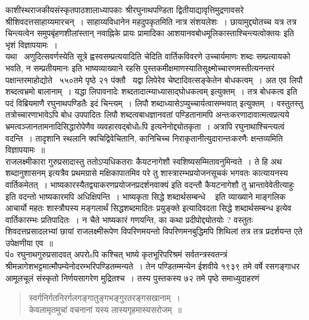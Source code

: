\documentclass[11pt, openany]{book}
\begin{document}
काशीस्थराजकीयसंस्कृतपाठशालाध्यापकाः श्रीरघुनाथपण्डिता द्वितीयाद्यावृत्तिमुद्रणावसरे श्रीशिवदत्तसाहाय्यमारचन्~। साहाय्यविधानेन महदुपकृतमिति नात्र संशयलेशः~। छायामुद्द्योतच्च यत्र तत्र चिन्त्यत्वेन समुपबृंहणशीलांस्तान् {\qt नवाह्निके प्रायः प्रामादिका आशयानवबोधमूलिकास्ताश्चिन्त्यत्वोक्तयः} इति भृशं विज्ञापयामः~।\\

यथा \textendash\ अणुदित्सवर्णस्येति सूत्रे ह्वस्वसम्प्रत्ययादिति चेदिति वार्तिकविवरणे {\qt उच्चार्यमाणः शब्दः सम्प्रत्यायको भवति, न सम्प्रतीयमानः} इति भाष्यव्याख्याने रहसि पुस्तकमीक्षमाणस्यातिसूक्ष्मोच्चारणमस्तीत्यनन्तरं पक्षान्तरमाहोद्योते \textendash\ ५५०तमे पृष्ठे २१ पंक्तौ \textendash\ {\qt यद्वा लिपेरेव चेष्टादिवत्सङ्केतेन बोधकत्वम्~। अत एव लिपौ शब्दत्वभ्रमो बालानाम्~। यद्धा लिपावनादेः शब्दतादात्म्याध्यासाद्घोधकत्वम्} इत्युक्तम्~। तत्र {\qt बोधकत्व इति पदं विब्रियमाणै रघुनाथपण्डितैः }इदं चिन्त्यम्~। लिपौ शब्दाध्यासेऽप्युच्चार्यत्वासम्भवात् इत्युक्तम्~। वस्तुतस्तु तत्रोच्चारणाभावेऽपि बोध उपपादितः {\qt लिपौ शब्दत्वबाधज्ञानवतां पण्डितानामपि अन्तःकरणादावात्मत्वप्रत्यये भ्रमत्वञ्जानतामनादिसिद्धारोपेणैव व्यवहारवद्बोधोsपि} इत्यनेनोद्द्योतकृता~। अत्रापि रघुनाथाश्चिन्त्यत्वं वदन्ति~। तादृशानि स्थलानि क्वचिद्विवेचितानि, कानिचिच्च निराकृतानीत्युदारान्तःकरणैः क्षन्तव्यमिति विज्ञापयामः~॥\\

राजलक्ष्मीकारा गुरुप्रसादास्तु ततोऽप्यधिकतराः कैयटनागेशौ स्वशिष्यसम्मितावनुमिन्वते~। ते हि अथ शब्दानुशासनम् इत्यत्रैव प्रथमग्रासे मक्षिकापातमिव {\qt परे तु शास्त्रारम्भप्रयोजनसूचकं भगवतः कात्यायनस्य वार्तिकमेतत्~। भाष्यकारस्यैतद्व्याकरणप्रयोजनप्रदर्शनवाक्यं इति वदन्तौ कैयटनागेशौ तु भ्रान्तावेवेतीत्याहुः} इति वदन्तो भाष्यकारमपि अधिक्षिपन्ति~। भाष्यकृता {\qt सिद्धे शब्दार्थसम्बन्धे \textendash\ } इति व्याख्याने {\qt माङ्गलिक आचार्यो महतः शास्त्रौघस्य मङ्गलार्थं सिद्धशब्दमादितः प्रयुङ्क्ते} इत्यादिवदता सिद्धे शब्दार्थसम्बन्ध इत्येव वार्तिकारम्भः प्रतिपादितः~। न चैते भाष्यकारं गणयन्ति, का कथा प्रदीपोद्द्योतयोः ? वस्तुतः शिवदत्तप्रसादलभ्यां छायां राजलक्ष्मीरूपेण विपरिणमयन्तो विपरिणमनबुद्धिमपि शिथिलां तत्र तत्र प्रदर्शयन्त एते उपेक्षणीया एव~॥\\

पं० रघुनाथगुरुप्रसादवत् अपरोsपि कश्चित् भाष्ये कृतभूरिपरिश्रमं सर्वतन्त्रस्वतन्त्रं श्रीमन्नागेशभट्टमात्मौपम्येनोदरम्भरिपण्डितम्मन्यते~। तेन पण्डितम्मन्येन ईशवीये १९३९ तमे वर्षे रसगङ्गाधर आमूलचूलं संस्कृतो निर्णयसागरेण मुद्रितश्च~। तस्य पुस्तकस्य ७२ तमे पृष्ठे समाध्युदाहरणं \textendash\

\begin{quote}
{\qt स्वर्गनिर्गतनिरर्गलगङ्गातुङ्गभङ्गुरतरङ्गसखानाम्~।\\
केवलामृतमुचां वचनानां यस्य लास्यगृहमास्यसरोजम्~॥}
\end{quote}
\end{document}
